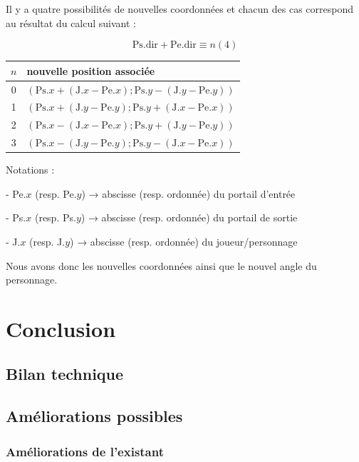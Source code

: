 \documentclass[11pt]{article}
\begin{document}
Il y a quatre possibilités de nouvelles coordonnées et chacun des cas correspond au résultat du calcul suivant :

$$\text{Ps.dir} + \text{Pe.dir} \equiv n (4)$$

\begin{center}
    \begin{tabular}{c|l}
            $n$ & nouvelle position associée \\
            \hline
            0 & $(\text{Ps}.x + (\text{J}.x - \text{Pe}.x) ; \text{Ps}.y - (\text{J}.y - \text{Pe}.y))$ \\ 
            1 & $(\text{Ps}.x + (\text{J}.y - \text{Pe}.y) ; \text{Ps}.y + (\text{J}.x - \text{Pe}.x))$ \\
            2 & $(\text{Ps}.x - (\text{J}.x - \text{Pe}.x) ; \text{Ps}.y + (\text{J}.y - \text{Pe}.y))$ \\
            3 & $(\text{Ps}.x - (\text{J}.y - \text{Pe}.y) ; \text{Ps}.y - (\text{J}.x - \text{Pe}.x))$ \\
    \end{tabular}
\end{center}

Notations :

- Pe.$x$ (resp. Pe.$y$) → abscisse (resp. ordonnée) du portail d’entrée

- Ps.$x$ (resp. Ps.$y$) → abscisse (resp. ordonnée) du portail de sortie

- J.$x$ (resp. J.$y$) → abscisse (resp. ordonnée) du joueur/personnage

Nous avons donc les nouvelles coordonnées ainsi que le nouvel angle du personnage.

\section{Conclusion}
\subsection{Bilan technique}
\subsection{Améliorations possibles}
\subsubsection{Améliorations de l'existant}
\end{document}
